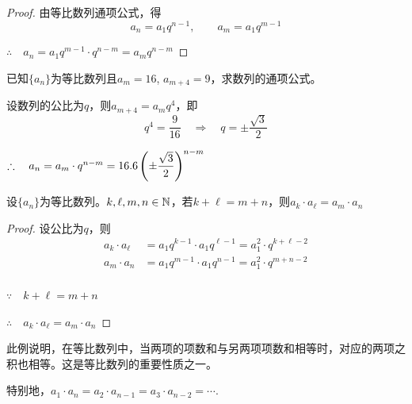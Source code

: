 \begin{proof}
    由等比数列通项公式，得
\[a_n=a_1q^{n-1},\qquad a_m=a_1q^{m-1}\]

$\therefore\quad a_n=a_1q^{m-1}\cdot q^{n-m}=a_m q^{n-m}$
\end{proof}


\begin{example}
    已知$\{a_n\}$为等比数列且$a_m=16$, $a_{m+4}=9$，求数列的通项公式。
\end{example}

\begin{solution}
设数列的公比为$q$，则$a_{m+4}=a_m q^4$，即
\[q^4=\frac{9}{16}\quad \Rightarrow\quad q=\pm\frac{\sqrt{3}}{2}\]

$\therefore\quad a_n=a_m\cdot q^{n-m}=16.6 \left(\pm\dfrac{\sqrt{3}}{2}\right)^{n-m}$
\end{solution}


\begin{example}
    设$\{a_n\}$为等比数列。$k,\ell,m,n\in\mathbb{N}$，若$k+\ell=m+n$，则$a_k\cdot a_{\ell}=a_m\cdot a_n$
\end{example}

\begin{proof}
    设公比为$q$，则
\[\begin{split}
    a_{k}\cdot a_{\ell}&=a_1q^{k-1}\cdot a_1q^{\ell-1}=a^2_1\cdot q^{k+\ell-2}\\
    a_{m}\cdot a_{n}&=a_1q^{m-1}\cdot a_1q^{n-1}=a^2_1\cdot q^{m+n-2}\\
\end{split}\]

$\because\quad k+\ell=m+n$

$\therefore\quad a_k\cdot a_{\ell}=a_m\cdot a_n$
\end{proof}

\begin{rmk}
    此例说明，在等比数列中，当两项的项数和与另两项项数和相等时，对应的两项之积也相等。这是等比数列的重要性质之一。

特别地，$a_1\cdot a_n=a_2\cdot a_{n-1}=a_3\cdot a_{n-2}=\cdots$.
\end{rmk}

